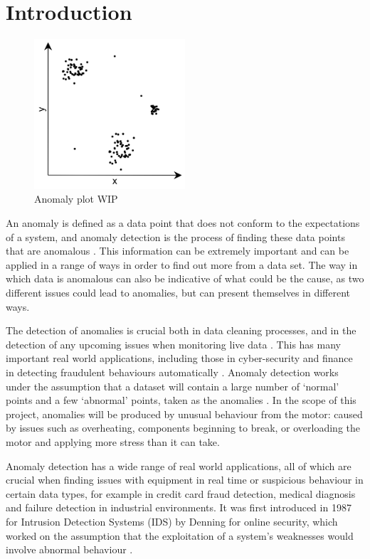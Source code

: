 \section{Introduction}

\begin{figure}[t]
    \centering
    \includegraphics[width=0.5\textwidth]{fig/anomalies.png}
    \caption[Anomalies]{Anomaly plot WIP}
    \label{fig:histogram}
\end{figure}

An anomaly is defined as a data point that does not conform to the expectations of a system, and anomaly detection is the process of finding these data points that are anomalous \cite{huang}. This information can be extremely important and can be applied in a range of ways in order to find out more from a data set. The way in which data is anomalous can also be indicative of what could be the cause, as two different issues could lead to anomalies, but can present themselves in different ways. 

The detection of anomalies is crucial both in data cleaning processes, and in the detection of any upcoming issues when monitoring live data \cite{Akouemo2016948}. This has many important real world applications, including those in cyber-security and finance in detecting fraudulent behaviours automatically \cite{618940}. Anomaly detection works under the assumption that a dataset will contain a large number of `normal' points and a few `abnormal' points, taken as the anomalies \cite{Pimentel2014215}. In the scope of this project, anomalies will be produced by unusual behaviour from the motor: caused by issues such as overheating, components beginning to break, or overloading the motor and applying more stress than it can take. 

Anomaly detection has a wide range of real world applications, all of which are crucial when finding issues with equipment in real time or suspicious behaviour in certain data types, for example in credit card fraud detection, medical diagnosis  and failure detection in industrial environments. It was first introduced in 1987 for Intrusion Detection Systems (IDS) by Denning for online security, which worked on the assumption that the exploitation of a system's weaknesses would involve abnormal behaviour \cite{1702202}. 

